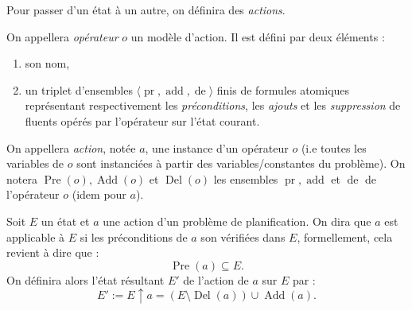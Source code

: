 Pour passer d'un état à un autre, on définira des \emph{actions}. 

\begin{definition}
    On appellera \emph{opérateur} $o$ un modèle d'action. Il est défini par deux éléments : 
    \begin{enumerate}
        \item son nom, 
        \item un triplet d'ensembles $\langle\operatorname{pr}, \operatorname{add}, \operatorname{de}\rangle$ finis de formules atomiques représentant respectivement les \emph{préconditions}, les \emph{ajouts} et les \emph{suppression} de fluents opérés par l'opérateur sur l'état courant. 
    \end{enumerate}
    On appellera \emph{action}, notée $a$, une instance d'un opérateur $o$ (i.e toutes les variables de $o$ sont instanciées à partir des variables/constantes du problème). On notera $ \operatorname{Pre}(o), \operatorname{Add}(o)$ et $ \operatorname{Del}(o)$ les ensembles $\operatorname{pr}, \operatorname{add}$ et $\operatorname{de}$ de l'opérateur $o$ (idem pour $a$). 
\end{definition}

\begin{definition}
    Soit $E$ un état et $a$ une action d'un problème de planification. On dira que $a$ est applicable à $E$ si les préconditions de $a$ son vérifiées dans $E$, formellement, cela revient à dire que : 
    \begin{equation}
        \operatorname{Pre}(a) \subseteq E. 
    \end{equation}
    On définira alors l'état résultant $E'$ de l'action de $a$ sur $E$ par : 
    \begin{equation}
        \boxed{E' := E \uparrow a = (E \setminus \operatorname{Del}(a)) \cup \operatorname{Add}(a). }
    \end{equation}
\end{definition}


